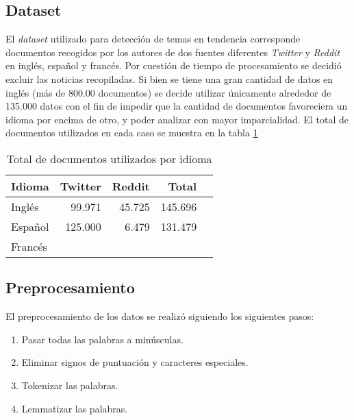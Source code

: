 \subsection{Dataset}
El \textit{dataset} utilizado para detección de temas en tendencia corresponde documentos recogidos por los autores de dos fuentes diferentes \textit{Twitter} y \textit{Reddit} en inglés, español y francés. Por cuestión de tiempo de procesamiento se decidió excluir las noticias recopiladas. Si bien se tiene una gran cantidad de datos en inglés (más de 800.00 documentos) se decide utilizar únicamente alrededor de 135.000 datos con el fin de impedir que la cantidad de documentos favoreciera un idioma por encima de otro, y poder analizar con mayor imparcialidad. El total de documentos utilizados en cada caso se muestra en la tabla \ref{tab:docs}

\begin{table}[]
\centering
\caption{Total de documentos utilizados por idioma}
\label{tab:docs}
\begin{tabular}{lrrrr}
\hline
\textbf{Idioma} & \textbf{Twitter} & \textbf{Reddit} & \textbf{Total} \\ \hline
Inglés          & 99.971           & 45.725          & 145.696        \\
Español         & 125.000          & 6.479           & 131.479        \\
Francés         &                  &                 &                \\ \hline
\end{tabular}
\end{table}

\subsection{Preprocesamiento}

El preprocesamiento de los datos se realizó siguiendo los siguientes pasos:
\begin{enumerate}
    \item Pasar todas las palabras a minúsculas.
    \item Eliminar signos de puntuación y caracteres especiales.
    \item Tokenizar las palabras.
    \item Lemmatizar las palabras.
\end{enumerate}

